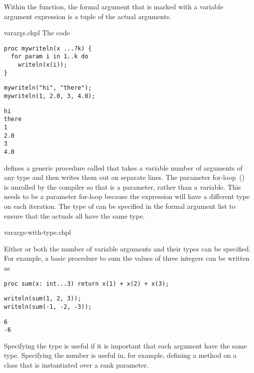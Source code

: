 Within the function, the formal argument that is marked with a
variable argument expression is a tuple of the actual
arguments.

\begin{chapelexample}{varargs.chpl}
The code
\begin{chapel}
\begin{verbatim}
proc mywriteln(x ...?k) {
  for param i in 1..k do
    writeln(x(i));
}
\end{verbatim}
\end{chapel}
\begin{chapelpost}
\begin{verbatim}
mywriteln("hi", "there");
mywriteln(1, 2.0, 3, 4.0);
\end{verbatim}
\end{chapelpost}
\begin{chapeloutput}
\begin{verbatim}
hi
there
1
2.0
3
4.0
\end{verbatim}
\end{chapeloutput}
defines a generic procedure called  that takes a
variable number of arguments of any type and then writes them out on
separate lines.  The parameter for-loop~()
is unrolled by the compiler so that  is a parameter, rather
than a variable.  This needs to be a parameter for-loop because the
expression  will have a different type on each iteration.
The type of  can be specified in the formal argument list to
ensure that the actuals all have the same type.
\end{chapelexample}

\begin{chapelexample}{varargs-with-type.chpl}

Either or both the number of variable arguments and their types can be
specified.  For example, a basic procedure to sum the values of three
integers can be written as
\begin{chapel}
\begin{verbatim}
proc sum(x: int...3) return x(1) + x(2) + x(3); 
\end{verbatim}
\end{chapel}
\begin{chapelpost}
\begin{verbatim}
writeln(sum(1, 2, 3));
writeln(sum(-1, -2, -3));
\end{verbatim}
\end{chapelpost}
\begin{chapeloutput}
\begin{verbatim}
6
-6
\end{verbatim}
\end{chapeloutput}
Specifying the type is useful if it is important that each argument
have the same type.  Specifying the number is useful in, for example,
defining a method on a class that is instantiated over a rank
parameter.
\end{chapelexample}


